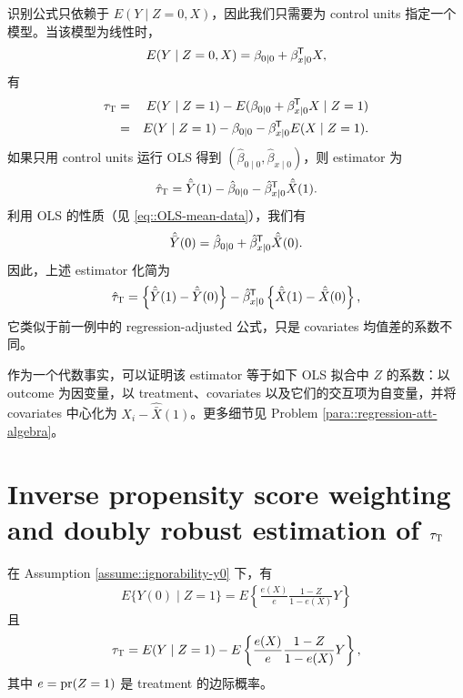 \begin{example}\label{eg::att-regression2}
识别公式只依赖于 $E(Y\mid Z=0, X)$，因此我们只需要为 control units 指定一个模型。当该模型为线性时，
$$
E(Y\mid Z=0, X) =\beta_{0\mid 0}   + \beta_{x\mid 0} ^{\mkern-1.5mu\mathsf{T}} X,
$$
有
\begin{eqnarray*}
\tau_\textsc{T} &=& E(Y\mid Z=1) - E(   \beta_{0\mid 0}   + \beta_{x\mid 0} ^{\mkern-1.5mu\mathsf{T}} X  \mid Z=1 ) \\
&=& E(Y\mid Z=1) -   \beta_{0\mid 0}    -  \beta_{x\mid 0}   ^{\mkern-1.5mu\mathsf{T}} E(X\mid Z=1). 
\end{eqnarray*}
如果只用 control units 运行 OLS 得到 $( \hat{\beta}_{0\mid 0} ,  \hat{\beta}_{x\mid 0})$，则 estimator 为
$$
\hat{\tau}_\textsc{T} = \hat{\bar{Y}}(1) -\hat{\beta}_{0\mid 0}  - \hat{\beta}_{x\mid 0}  ^{\mkern-1.5mu\mathsf{T}} \hat{\bar{X}}(1).
$$
利用 OLS 的性质（见 \ref{eq::OLS-mean-data}），我们有
$$
\hat{\bar{Y}}(0) = \hat{\beta}_{0\mid 0} + \hat{\beta}_{x\mid 0}  ^{\mkern-1.5mu\mathsf{T}} \hat{\bar{X}}(0).
$$ 
因此，上述 estimator 化简为
$$
\hat{\tau}_\textsc{T} = \left\{  \hat{\bar{Y}}(1) - \hat{\bar{Y}}(0) \right\} - \hat{\beta}_{x\mid 0}  ^{\mkern-1.5mu\mathsf{T}} \left\{  \hat{\bar{X}}(1) -  \hat{\bar{X}}(0) \right\}, 
$$
它类似于前一例中的 regression-adjusted 公式，只是 covariates 均值差的系数不同。

作为一个代数事实，可以证明该 estimator 等于如下 OLS 拟合中 $Z$ 的系数：以 outcome 为因变量，以 treatment、covariates 以及它们的交互项为自变量，并将 covariates 中心化为 $ X_i  - \hat{\bar{X}}(1)$。更多细节见 Problem \ref{para::regression-att-algebra}。
\end{example}




\section{Inverse propensity score weighting and doubly robust estimation of $\tau_\textsc{T} $}


\begin{theorem}
\label{thm::ipw-att}
在 Assumption \ref{assume::ignorability-y0} 下，有
\begin{eqnarray}
E\{ Y(0) \mid Z=1 \} = E\left\{         \frac{e(X)}{e}  \frac{1-Z}{1-e(X)} Y \right\}
\label{eq::ipw-att}
\end{eqnarray}
且
\begin{eqnarray}\label{eq::att-ipw-formula}
\tau_\textsc{T} = E(Y\mid Z=1) -  E\left\{         \frac{e(X)}{e}  \frac{1-Z}{1-e(X)} Y \right\} ,
\end{eqnarray}
其中 $e = \textup{pr}(Z=1)$ 是 treatment 的边际概率。
\end{theorem}


